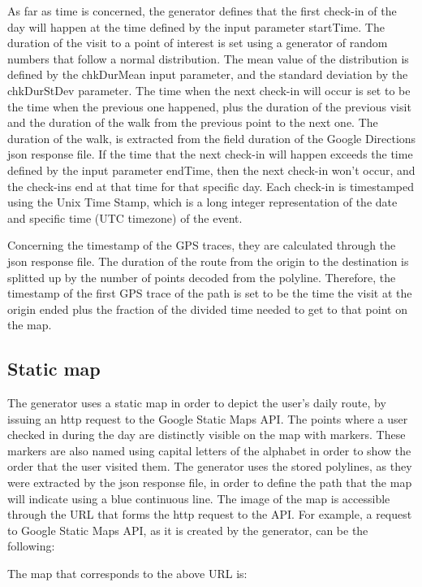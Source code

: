 As far as time is concerned, the generator defines that the first check-in of the day will happen at the time defined by the input parameter startTime. 
The duration of the visit to a point of interest is set 
using a generator of random numbers that follow a normal distribution. The mean value of the distribution is defined by the chkDurMean input parameter, and 
the standard deviation by the chkDurStDev parameter. The time when the next check-in will occur is set to be the time when the previous one happened, plus 
the duration of the previous visit and the duration of the walk from the previous point to the next one. The duration of the walk, is extracted from 
the field duration of the Google Directions json response file. If the time that the next check-in will happen exceeds the time defined by the input parameter 
endTime, then the next check-in won't occur, and the check-ins end at that time for that specific day. Each check-in is timestamped 
using the Unix Time Stamp, which is a long integer representation of the date and specific time (UTC timezone) of the event.

Concerning the timestamp of the GPS traces, they are calculated through the json response file. The duration of the route from the origin to the destination is 
splitted up by the number of points decoded from the polyline. Therefore, the timestamp of the first GPS trace of the path is set to be the time the visit 
at the origin ended plus the fraction of the divided time needed to get to that point on the map.

\subsection{Static map}

The generator uses a static map in order to depict the user's daily route, by issuing an http request to the Google Static Maps API. 
The points where a user checked in during the day are distinctly visible on the map with markers. These markers are also named using capital 
letters of the alphabet in order to show the order that the user visited them. The generator uses the stored polylines, as they were extracted by the json 
response file, in order to define the path that the map will indicate using a blue continuous line. The image of the map is accessible through the URL that 
forms the http request to the API.
For example, a request to Google Static Maps API, 
as it is created by the generator, can be the following:
\begin{center}
\end{center}
The map that corresponds to the above URL is:

